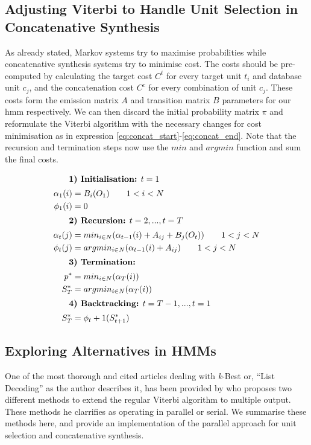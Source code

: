 {{{{{{{{\subsection{Adjusting Viterbi to Handle Unit Selection in Concatenative Synthesis}

As already stated, Markov systems try to maximise probabilities while concatenative synthesis systems try to minimise cost. The costs should be pre-computed by calculating the target cost $C^{t}$ for every target unit $t_i$ and database unit $c_j$, and the concatenation cost $C^{c}$ for every combination of unit $c_j$. These costs form the emission matrix $A$ and transition matrix $B$ parameters for our \acrshort{hmm} respectively. We can then discard the initial probability matrix $\pi$ and reformulate the Viterbi algorithm with the necessary changes for cost minimisation as in expression \ref{eq:concat_start}-\ref{eq:concat_end}. Note that the recursion and termination steps now use the $min$ and $argmin$ function and sum the final costs. 

\setlength{\parindent}{1cm}

\indent
{
\begin{align}
\intertext{ \indent \textbf{1) Initialisation:} $t=1$}
			\alpha_1(i) &= B_{i}(O_1)\qquad1<i<N \nonumber \\
			\phi_1(i) &= 0 \label{eq:concat_start} \\
\intertext{ \indent \textbf{2) Recursion:} $t=2,...,t=T$}
			\alpha_t(j) &= min_{i\in N}(\alpha_{t-1}(i)+A_{ij}+B_{j}(O_{t}))\qquad1<j<N \nonumber \\
			\phi_t(j) &= argmin_{i\in N}(\alpha_{t-1}(i)+A_{ij})\qquad1<j<N\\
\intertext{ \indent \textbf{3) Termination:}}
			p^* &= min_{i \in N}(\alpha_T(i)) \nonumber \\
			S^*_{T} &= argmin_{i \in N}(\alpha_T(i))\\
\intertext{ \indent \textbf{4) Backtracking:} $t=T-1,...,t=1$}
			S^*_{T} &= \phi_t+1(S^*_{t+1}) \label{eq:concat_end}
\end{align}
}

\normalsize

\subsection{Exploring Alternatives in HMMs}

One of the most thorough and cited articles dealing with \textit{k}-Best or, ``List Decoding'' as the author describes it, has been provided by \citep{Seshadri1994} who proposes two different methods to extend the regular Viterbi algorithm to multiple output. These methods he clarrifies  as operating in parallel or serial.  We summarise these methods here, and provide an implementation of the parallel approach for unit selection and concatenative synthesis.

}}}}}}}}
